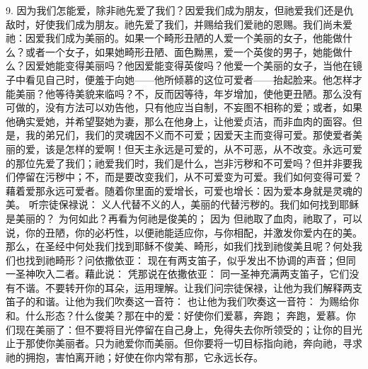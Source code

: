 9.   因为我们怎能爱，除非祂先爱了我们？因爱我们成为朋友，但祂爱我们还是仇敌时，好使我们成为朋友。祂先爱了我们，并赐给我们爱祂的恩赐。我们尚未爱祂：因爱我们成为美丽的。如果一个畸形丑陋的人爱一个美丽的女子，他能做什么？或者一个女子，如果她畸形丑陋、面色黝黑，爱一个英俊的男子，她能做什么？因爱她能变得美丽吗？他因爱能变得英俊吗？他爱一个美丽的女子，当他在镜子中看见自己时，便羞于向她——他所倾慕的这位可爱者——抬起脸来。他怎样才能美丽？他等待美貌来临吗？不，反而因等待，年岁增加，使他更丑陋。那么没有可做的，没有方法可以劝告他，只有他应当自制，不妄图不相称的爱；或者，如果他确实爱她，并希望娶她为妻，那么在他身上，让他爱贞洁，而非血肉的面容。但是，我的弟兄们，我们的灵魂因不义而不可爱；因爱天主而变得可爱。那使爱者美丽的爱，该是怎样的爱啊！但天主永远是可爱的，从不可恶，从不改变。永远可爱的那位先爱了我们；祂爱我们时，我们是什么，岂非污秽和不可爱吗？但并非要我们停留在污秽中；不，而是要改变我们，从不可爱变为可爱。我们如何变得可爱？藉着爱那永远可爱者。随着你里面的爱增长，可爱也增长：因为爱本身就是灵魂的美。 听宗徒保禄说：  义人代替不义的人，美丽的代替污秽的。我们如何找到耶稣是美丽的？ 为何如此？再看为何祂是俊美的； 因为  但祂取了血肉，祂取了，可以说，你的丑陋，你的必朽性，以便祂能适应你，与你相配，并激发你爱内在的美。那么，在圣经中何处我们找到耶稣不俊美、畸形，如我们找到祂俊美且呢？何处我们也找到祂畸形？问依撒依亚：  现在有两支笛子，似乎发出不协调的声音；但同一圣神吹入二者。藉此说： 凭那说在依撒依亚： 同一圣神充满两支笛子，它们没有不谐。不要转开你的耳朵，运用理解。让我们问宗徒保禄，让他为我们解释两支笛子的和谐。让他为我们吹奏这一音符：  也让他为我们吹奏这一音符：  为赐给你和。什么形态？什么俊美？那在中的爱：好使你们爱慕，奔跑； 奔跑，爱慕。你们现在美丽了：但不要将目光停留在自己身上，免得失去你所领受的；让你的目光止于那使你美丽者。只为祂爱你而美丽。但你要将一切目标指向祂，奔向祂，寻求祂的拥抱，害怕离开祂；好使在你内常有那，它永远长存。\par

